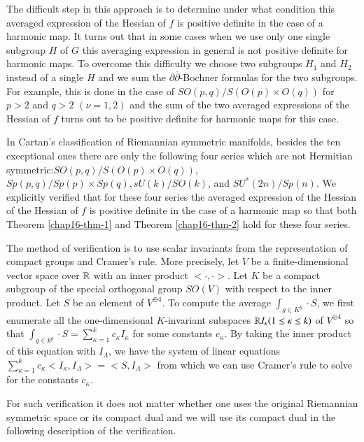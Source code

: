 The difficult step in this approach is to determine under what condition this averaged expression of the Hessian of $f$ is positive definite in the case of a harmonic map. It turns out that in some cases when we use only one single subgroup $H$ of $G$ this averaging expression in general is not positive definite for harmonic maps. To overcome this difficulty we choose two subgroups $H_{1}$ and $H_{2}$ instead of a single $H$ and we sum the $\partial\overline{\partial}$-Bochner formulas for the two subgroups. For example, this is done in the case of $SO(p,q)/S(O(p) \times O(q))$ for $p > 2$ and $q>2$ $(\nu =1, 2)$ and the sum of the two averaged expressions of the Hessian of $f$ turns out to be positive definite for harmonic maps for this case.

In Cartan's classification of Riemannian symmetric manifolds, besides the ten exceptional ones there are only the following four series which are not Hermitian symmetric:$ SO(p,q)/S(O(p)\times O(q))$,\break $Sp(p,q)/Sp(p)\times Sp(q), sU(k)/SO(k)$, and $SU^{*}(2n)/Sp(n)$. We explicitly verified that for these four series the averaged expression of the Hessian of the Hessian of $f$ is positive definite in the case of a harmonic map so that both Theorem \ref{chap16-thm-1} and Theorem \ref{chap16-thm-2} hold for these four series.  

The method of verification is to use scalar invariants from the representation of compact groups and Cramer's rule. More precisely, let $V$ be a finite-dimensional vector space over $\mathbb{R}$ with an inner product $<\cdot, \cdot>$. Let $K$ be a compact subgroup of the special orthogonal group $SO(V)$ with respect to the inner product. Let $S$ be an element of $V^{\oplus 4}$. To compute the average $\int_{g \in K^{g}} \cdot S$, we first enumerate all the one-dimensional $K$-invariant subspaces $\mathbb{R} I_{\kappa} (1 \leq \kappa \leq k)$ of $V^{\oplus 4}$ so that $\int_{g \in k^{g}}\cdot S= \sum_{\kappa=1}^{k} c_{\kappa}I_{\kappa}$ for some constants $c_{\kappa}$. By taking the inner product of this equation with $I_{\Lambda}$, we have the system of linear equations $\sum_{\kappa=1}^{k} c_{\kappa}< I_{\kappa},I_{\Lambda}> =<S, I_{\Lambda}>$ from which we can use Cramer's rule to solve for the constants $c_{\kappa}$. 

For such verification it does not matter whether one uses the original Riemannian symmetric space or its compact dual and we will use its compact dual in the following description of the verification.

